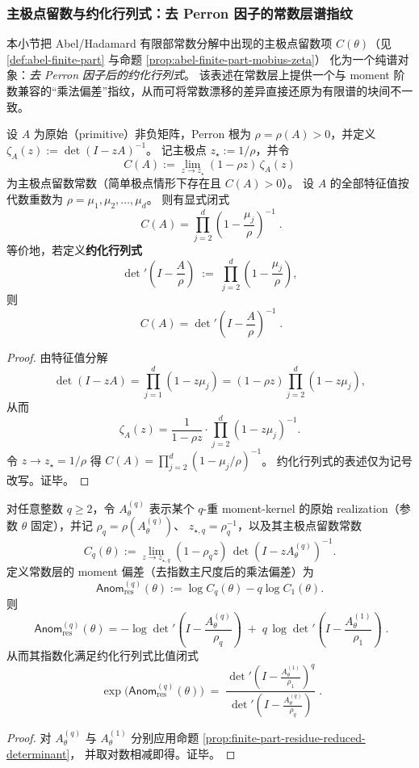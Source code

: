 \subsubsection{主极点留数与约化行列式：去 Perron 因子的常数层谱指纹}\label{subsec:finite-part-reduced-determinant-residue}
本小节把 Abel/Hadamard 有限部常数分解中出现的主极点留数项 \(C(\theta)\)（见 \ref{def:abel-finite-part} 与命题 \ref{prop:abel-finite-part-mobius-zeta}）
化为一个纯谱对象：\emph{去 Perron 因子后的约化行列式}。
该表述在常数层上提供一个与 moment 阶数兼容的“乘法偏差”指纹，从而可将常数漂移的差异直接还原为有限谱的块间不一致。

\begin{proposition}[主极点留数的谱乘积公式]\label{prop:finite-part-residue-reduced-determinant}
设 \(A\) 为原始（primitive）非负矩阵，Perron 根为 \(\rho=\rho(A)>0\)，并定义
\(
\zeta_A(z):=\det(I-zA)^{-1}
\)。
记主极点 \(z_\star:=1/\rho\)，并令
\[
C(A):=\lim_{z\to z_\star}(1-\rho z)\,\zeta_A(z)
\]
为主极点留数常数（简单极点情形下存在且 \(C(A)>0\)）。
设 \(A\) 的全部特征值按代数重数为 \(\rho=\mu_1,\mu_2,\dots,\mu_d\)。
则有显式闭式
\[
\boxed{\;
C(A)=\prod_{j=2}^{d}\left(1-\frac{\mu_j}{\rho}\right)^{-1}\; }.
\]
等价地，若定义\textbf{约化行列式}
\[
\det\nolimits'\!\left(I-\frac{A}{\rho}\right)
\;:=\;
\prod_{j=2}^{d}\left(1-\frac{\mu_j}{\rho}\right),
\]
则
\[
\boxed{\;
C(A)=\det\nolimits'\!\left(I-\frac{A}{\rho}\right)^{-1}\; }.
\]
\end{proposition}
\begin{proof}
由特征值分解
\[
\det(I-zA)=\prod_{j=1}^{d}(1-z\mu_j)=(1-\rho z)\prod_{j=2}^{d}(1-z\mu_j),
\]
从而
\[
\zeta_A(z)=\frac{1}{1-\rho z}\cdot \prod_{j=2}^{d}(1-z\mu_j)^{-1}.
\]
令 \(z\to z_\star=1/\rho\) 得
\(
C(A)=\prod_{j=2}^{d}(1-\mu_j/\rho)^{-1}
\)。
约化行列式的表述仅为记号改写。证毕。
\end{proof}

\begin{corollary}\label{cor:finite-part-moment-anomaly-reduced-determinant-ratio}
对任意整数 \(q\ge 2\)，令 \(A^{(q)}_\theta\) 表示某个 \(q\)-重 moment-kernel 的原始 realization（参数 \(\theta\) 固定），并记
\(
\rho_q=\rho(A^{(q)}_\theta)
\)、
\(
z_{\star,q}=\rho_q^{-1}
\)，以及其主极点留数常数
\[
C_q(\theta):=\lim_{z\to z_{\star,q}}(1-\rho_q z)\,\det(I-zA^{(q)}_\theta)^{-1}.
\]
定义常数层的 moment 偏差（去指数主尺度后的乘法偏差）为
\[
\mathsf{Anom}^{(q)}_{\mathrm{res}}(\theta):=\log C_q(\theta)-q\log C_1(\theta).
\]
则
\[
\boxed{\;
\mathsf{Anom}^{(q)}_{\mathrm{res}}(\theta)
=
-\log\det\nolimits'\!\left(I-\frac{A^{(q)}_\theta}{\rho_q}\right)
\;+\;
q\,\log\det\nolimits'\!\left(I-\frac{A^{(1)}_\theta}{\rho_1}\right)\; }.
\]
从而其指数化满足约化行列式比值闭式
\[
\boxed{\;
\exp\bigl(\mathsf{Anom}^{(q)}_{\mathrm{res}}(\theta)\bigr)
\;=\;
\frac{\det\nolimits'\!\left(I-\frac{A^{(1)}_\theta}{\rho_1}\right)^{q}}
{\det\nolimits'\!\left(I-\frac{A^{(q)}_\theta}{\rho_q}\right)}\; }.
\]
\end{corollary}
\begin{proof}
对 \(A^{(q)}_\theta\) 与 \(A^{(1)}_\theta\) 分别应用命题 \ref{prop:finite-part-residue-reduced-determinant}，
并取对数相减即得。证毕。
\end{proof}

